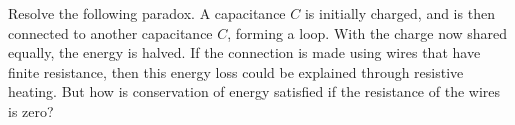 Resolve the following paradox. A capacitance $C$ is initially charged,
and is then connected to another capacitance $C$, forming a loop. With the
charge now shared equally, the energy is halved. If the connection is made
using wires that have finite resistance, then this energy loss could be
explained through resistive heating. But how is conservation of energy
satisfied if the resistance of the wires
is zero?

